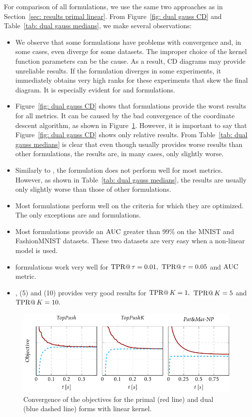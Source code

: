 For comparison of all formulations, we use the same two approaches as in Section~\ref{sec: results primal linear}. From Figure~\ref{fig: dual gauss CD} and Table~\ref{tab: dual gauss medians}, we make several observations:
\begin{itemize}
  \item We observe that some formulations have problems with convergence and, in some cases, even diverge for some datasets. The improper choice of the kernel function parameters can be the cause. As a result, CD diagrams may provide unreliable results. If the formulation diverges in some experiments, it immediately obtains very high ranks for these experiments that skew the final diagram. It is especially evident for \PatMatNP and \SVM formulations.
  \item Figure~\ref{fig: dual gauss CD} shows that \PatMatNP formulations provide the worst results for all metrics. It can be caused by the bad convergence of the coordinate descent algorithm, as shown in Figure~\ref{fig: dual convergence}. However, it is important to say that Figure~\ref{fig: dual gauss CD} shows only relative results. From Table~\ref{tab: dual gauss medians} is clear that even though \PatMatNP usually provides worse results than other formulations, the results are, in many cases, only slightly worse.
  \item Similarly to \PatMatNP, the \SVM formulation does not perform well for most metrics. However, as shown in Table~\ref{tab: dual gauss medians}, the results are usually only slightly worse than those of other formulations.
  \item Most formulations perform well on the criteria for which they are optimized. The only exceptions are \SVM and \PatMat formulations.
  \item Most formulations provide an $\operatorname{AUC}$ greater than 99\% on the MNIST and FashionMNIST datasets. These two datasets are very easy when a non-linear model is used.
  \item \tauFPL formulations work very well for $\operatorname{TPR@}\tau = 0.01,$ $\operatorname{TPR@}\tau = 0.05$ and $\operatorname{AUC}$ metric.
  \item \TopPush, \TopPushK(5) and \TopPushK(10) provides very good results for $\operatorname{TPR@}K = 1,$ $\operatorname{TPR@}K = 5$ and $\operatorname{TPR@}K = 10.$
\end{itemize}

\pagebreak

\begin{figure}
  \centering
  \includegraphics{images/convergence_dual.pdf}
  \caption{Convergence of the objectives for the primal (red line) and dual (blue dashed line) forms with linear kernel.}
  \label{fig: dual convergence}
\end{figure}

